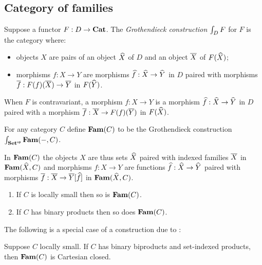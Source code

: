 \subsection{Category of families}
\label{sec:grothendieck}

\begin{definition}
Suppose a functor $F: D \to \mathbf{Cat}$. The \emph{Grothendieck construction} $\int_{D}F$ for $F$ is the
category where:
\begin{itemize}
\item objects $X$ are pairs of an object $\widehat{X}$ of $D$ and an object $\overline{X}$ of $F(\widehat{X})$;
\item morphisms $f: X \to Y$ are morphisms $\widehat{f}: \widehat{X} \to \widehat{Y}$ in $D$ paired with morphisms
$\overline{f}: F(f)(\overline{X}) \to \overline{Y}$ in $F(\widehat{Y})$.
\end{itemize}
\end{definition}

\noindent When $F$ is contravariant, a morphism $f: X \to Y$ is a morphism $\widehat{f}: \widehat{X} \to \widehat{Y}$ in
$D$ paired with a morphism $\overline{f}: \overline{X} \to F(f)(\overline{Y})$ in $F(\widehat{X})$.

\begin{definition}
For any category $C$ define $\mathbf{Fam}(C)$ to be the Grothendieck construction
$\int_{\mathbf{Set}^{\mathsf{op}}}\mathbf{Fam}(-,C)$.
\end{definition}

\noindent In $\mathbf{Fam}(C)$ the objects $X$ are thus sets $\widehat{X}$ paired with indexed families $\overline{X}$ in
$\mathbf{Fam}(\widehat{X},C)$ and morphisms $f: X \to Y$ are functions $\widehat{f}: \widehat{X} \to \widehat{Y}$ paired with
morphisms $\overline{f}: \overline{X} \to \overline{Y}[\widehat{f}]$ in $\mathbf{Fam}(\widehat{X},C)$.

\begin{proposition}
\item
\begin{enumerate}
\item If $C$ is locally small then so is $\mathbf{Fam}(C)$.
\item If $C$ has binary products then so does $\mathbf{Fam}(C)$.
\end{enumerate}
\end{proposition}

The following is a special case of a construction due to \citet{nunes2023}:

\begin{proposition}
Suppose $C$ locally small. If $C$ has binary biproducts and set-indexed products, then $\mathbf{Fam}(C)$ is Cartesian
closed. 
\end{proposition}


